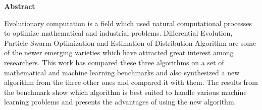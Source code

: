 \documentclass[10pt, titlepage, a4paper]{article}
\renewcommand{\abstractname}{Abstract}
\begin{document}
\begin{titlepage}

\end{titlepage}

\thispagestyle{fancy}
\fancyfoot[L]{}
\renewcommand{\headrulewidth}{0.4pt}
\renewcommand{\footrulewidth}{0.4pt}


\def\abstract{
   \vfil
\begin{center}%
{\bfseries\abstractname\vspace{-.5em}}
\end{center}
\itshape
}

\def\endabstract{\par
}


\newpage







\begin{abstract}

Evolutionary computation is a field which used natural computational processes to optimize mathematical and industrial problems. Differential Evolution, Particle Swarm Optimization and Estimation of Distribution Algorithm are some of the newer emerging varieties which have attracted great interest among researchers. This work has compared these three algorithms on a set of mathematical and machine learning benchmarks and also synthesized a new algorithm from the three other ones and compared it with them. The results from the benchmark show which algorithm is best suited to handle various machine learning problems and presents the advantages of using the new algorithm.

\end{abstract}
\newpage
\hypersetup{linkcolor=black}
\tableofcontents
\hypersetup{linkcolor=red}
\end{document}
